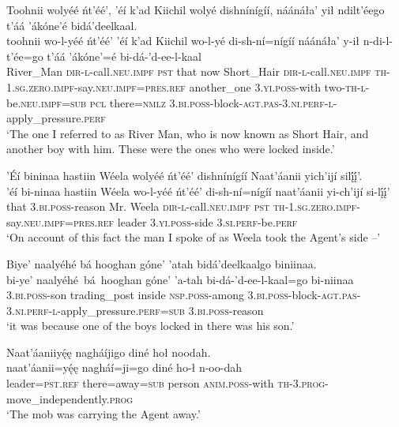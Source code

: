 \ea\label{ex:text1-40-5}
Toohnii wolyéé ńt’éé’, ’éí k’ad Kiichil wolyé dishnínígíí, náánáła’ yił ndilt’éego t’áá ’ákóne’é bidá’deelkaal.\\
\gll toohnii	wo-l-yéé	ńt’éé’	’éí	k’ad	Kiichil	wo-l-yé	di-sh-ní=nígíí	náánáła’	y-ił	n-di-l-t’ée=go	t’áá	’ákóne’=é	bi-dá-’d-ee-l-kaal\\
     River\_Man	\textsc{dir}-\textsc{l}-call.\textsc{neu}.\textsc{impf}	\textsc{pst}	that	now	Short\_Hair	\textsc{dir}-\textsc{l}-call.\textsc{neu}.\textsc{impf}	\textsc{th}-1.\textsc{sg}.\textsc{zero}.\textsc{impf}-say.\textsc{neu}.\textsc{impf}=\textsc{pres}.\textsc{ref}	another\_one	3.\textsc{yi}.\textsc{poss}-with	two-\textsc{th}-\textsc{l}-be.\textsc{neu}.\textsc{impf}=\textsc{sub}	\textsc{pcl}	there=\textsc{nmlz}	3.\textsc{bi}.\textsc{poss}-block-\textsc{agt}.\textsc{pas}-3.\textsc{ni}.\textsc{perf}-\textsc{l}-apply\_pressure.\textsc{perf}\\
\glt `The one I referred to as River Man, who is now known as Short Hair, and another boy with him. These were the ones who were locked inside.'
\z

\ea\label{ex:text1-40-6}
’Éí bininaa hastiin Wéela wolyéé ńt’éé’ dishnínígíí Naat’áanii yich’ijí silį́į́’.\\
\gll ’éí	bi-ninaa	hastiin	Wéela	wo-l-yéé	ńt’éé’	di-sh-ní=nígíí	naat’áanii	yi-ch’ijí	si-lį́į́’\\
     that	3.\textsc{bi}.\textsc{poss}-reason	Mr.	Weela	\textsc{dir}-\textsc{l}-call.\textsc{neu}.\textsc{impf}	\textsc{pst}	\textsc{th}-1.\textsc{sg}.\textsc{zero}.\textsc{impf}-say.\textsc{neu}.\textsc{impf}=\textsc{pres}.\textsc{ref}	leader	3.\textsc{yi}.\textsc{poss}-side	3.\textsc{si}.\textsc{perf}-be.\textsc{perf}\\
\glt `On account of this fact the man I spoke of as Weela took the Agent's side --'
\z

\ea\label{ex:text1-40-7}
Biye’ naalyéhé bá hooghan góne’ ’atah bidá’deelkaalgo biniinaa.\\
\gll bi-ye’	naalyéhé~bá~{hooghan}	góne’	’a-tah	bi-dá-’d-ee-l-kaal=go	bi-niinaa\\
     3.\textsc{bi}.\textsc{poss}-son	trading\_post	inside	\textsc{nsp}.\textsc{poss}-among	3.\textsc{bi}.\textsc{poss}-block-\textsc{agt}.\textsc{pas}-3.\textsc{ni}.\textsc{perf}-\textsc{l}-apply\_pressure.\textsc{perf}=\textsc{sub}	3.\textsc{bi}.\textsc{poss}-reason\\
\glt `it was because one of the boys locked in there was his son.'
\z

\ea\label{ex:text1-41-1}
Naat’áaniiyę́ę nagháíjigo diné hoł noodah.\\
\gll naat’áanii=yę́ę	nagháí=ji=go	diné	ho-ł	n-oo-dah\\
     leader=\textsc{pst}.\textsc{ref}	there=away=\textsc{sub}	person	\textsc{anim}.\textsc{poss}-with	\textsc{th}-3.\textsc{prog}-move\_independently.\textsc{prog}\\
\glt `The mob was carrying the Agent away.'
\z

